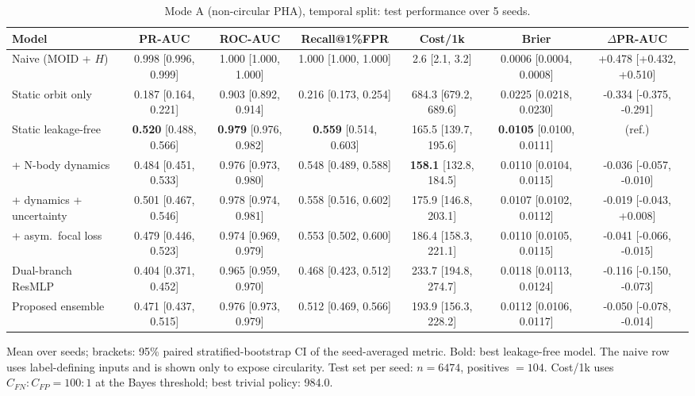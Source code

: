 \begin{table}[t]
\centering
\small
\caption{Mode A (non-circular PHA), temporal split: test performance over 5 seeds.}
\label{tab:pha_temporal_all}
\begin{tabular}{lcccccc}
\toprule
Model & PR-AUC & ROC-AUC & Recall@1\%FPR & Cost/1k & Brier & $\Delta$PR-AUC \\
\midrule
Naive (MOID + $H$) & 0.998 \scriptsize{[0.996, 0.999]} & 1.000 \scriptsize{[1.000, 1.000]} & 1.000 \scriptsize{[1.000, 1.000]} & 2.6 \scriptsize{[2.1, 3.2]} & 0.0006 \scriptsize{[0.0004, 0.0008]} & +0.478 \scriptsize{[+0.432, +0.510]} \\
\midrule
Static orbit only & 0.187 \scriptsize{[0.164, 0.221]} & 0.903 \scriptsize{[0.892, 0.914]} & 0.216 \scriptsize{[0.173, 0.254]} & 684.3 \scriptsize{[679.2, 689.6]} & 0.0225 \scriptsize{[0.0218, 0.0230]} & -0.334 \scriptsize{[-0.375, -0.291]} \\
Static leakage-free & \textbf{0.520} \scriptsize{[0.488, 0.566]} & \textbf{0.979} \scriptsize{[0.976, 0.982]} & \textbf{0.559} \scriptsize{[0.514, 0.603]} & 165.5 \scriptsize{[139.7, 195.6]} & \textbf{0.0105} \scriptsize{[0.0100, 0.0111]} & (ref.) \\
+ N-body dynamics & 0.484 \scriptsize{[0.451, 0.533]} & 0.976 \scriptsize{[0.973, 0.980]} & 0.548 \scriptsize{[0.489, 0.588]} & \textbf{158.1} \scriptsize{[132.8, 184.5]} & 0.0110 \scriptsize{[0.0104, 0.0115]} & -0.036 \scriptsize{[-0.057, -0.010]} \\
+ dynamics + uncertainty & 0.501 \scriptsize{[0.467, 0.546]} & 0.978 \scriptsize{[0.974, 0.981]} & 0.558 \scriptsize{[0.516, 0.602]} & 175.9 \scriptsize{[146.8, 203.1]} & 0.0107 \scriptsize{[0.0102, 0.0112]} & -0.019 \scriptsize{[-0.043, +0.008]} \\
+ asym.\ focal loss & 0.479 \scriptsize{[0.446, 0.523]} & 0.974 \scriptsize{[0.969, 0.979]} & 0.553 \scriptsize{[0.502, 0.600]} & 186.4 \scriptsize{[158.3, 221.1]} & 0.0110 \scriptsize{[0.0105, 0.0115]} & -0.041 \scriptsize{[-0.066, -0.015]} \\
Dual-branch ResMLP & 0.404 \scriptsize{[0.371, 0.452]} & 0.965 \scriptsize{[0.959, 0.970]} & 0.468 \scriptsize{[0.423, 0.512]} & 233.7 \scriptsize{[194.8, 274.7]} & 0.0118 \scriptsize{[0.0113, 0.0124]} & -0.116 \scriptsize{[-0.150, -0.073]} \\
Proposed ensemble & 0.471 \scriptsize{[0.437, 0.515]} & 0.976 \scriptsize{[0.973, 0.979]} & 0.512 \scriptsize{[0.469, 0.566]} & 193.9 \scriptsize{[156.3, 228.2]} & 0.0112 \scriptsize{[0.0106, 0.0117]} & -0.050 \scriptsize{[-0.078, -0.014]} \\
\bottomrule
\end{tabular}
\par\vspace{2pt}\footnotesize Mean over seeds; brackets: 95\% paired stratified-bootstrap CI of the seed-averaged metric. Bold: best leakage-free model. The naive row uses label-defining inputs and is shown only to expose circularity. Test set per seed: $n=6474$, positives $=104$. Cost/1k uses $C_{FN}{:}C_{FP}=100{:}1$ at the Bayes threshold; best trivial policy: 984.0.
\end{table}
